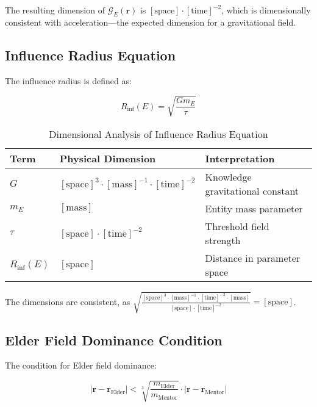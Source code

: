 The resulting dimension of $\mathcal{G}_E(\mathbf{r})$ is $[\text{space}] \cdot [\text{time}]^{-2}$, which is dimensionally consistent with acceleration—the expected dimension for a gravitational field.

\subsection{Influence Radius Equation}

The influence radius is defined as:

\begin{equation}
R_{\text{inf}}(E) = \sqrt{\frac{G m_E}{\tau}}
\end{equation}

\begin{table}[h]
\centering
\caption{Dimensional Analysis of Influence Radius Equation}
\label{tab:dimensional_analysis_influence_radius}
\begin{tabular}{p{3cm} p{5cm} p{6cm}}
\textbf{Term} & \textbf{Physical Dimension} & \textbf{Interpretation} \\
\hline
$G$ & $[\text{space}]^3 \cdot [\text{mass}]^{-1} \cdot [\text{time}]^{-2}$ & Knowledge gravitational constant \\
$m_E$ & $[\text{mass}]$ & Entity mass parameter \\
$\tau$ & $[\text{space}] \cdot [\text{time}]^{-2}$ & Threshold field strength \\
\hline
$R_{\text{inf}}(E)$ & $[\text{space}]$ & Distance in parameter space \\
\hline
\end{tabular}
\end{table}

The dimensions are consistent, as $\sqrt{\frac{[\text{space}]^3 \cdot [\text{mass}]^{-1} \cdot [\text{time}]^{-2} \cdot [\text{mass}]}{[\text{space}] \cdot [\text{time}]^{-2}}} = [\text{space}]$.

\subsection{Elder Field Dominance Condition}

The condition for Elder field dominance:

\begin{equation}
|\mathbf{r} - \mathbf{r}_{\text{Elder}}| < \sqrt[3]{\frac{m_{\text{Elder}}}{m_{\text{Mentor}}}} \cdot |\mathbf{r} - \mathbf{r}_{\text{Mentor}}|
\end{equation}

